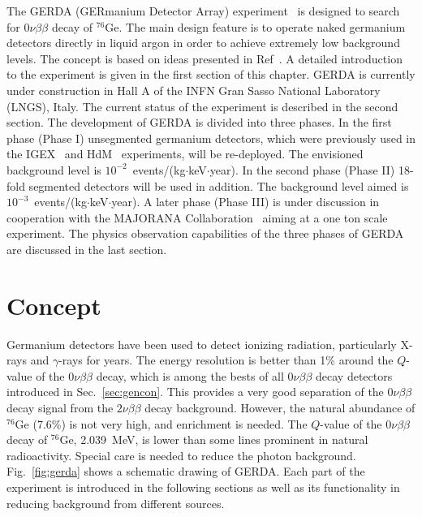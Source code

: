 The GERDA (GERmanium Detector Array) experiment~\cite{Abt04, Sch05} is designed to search for $0\nu\beta\beta$ decay of $^{76}$Ge. The main design feature is to operate naked germanium detectors directly in liquid argon in order to achieve extremely low background levels. The concept is based on ideas presented in Ref~\cite{Heu95}. A detailed introduction to the experiment is given in the first section of this chapter. GERDA is currently under construction in Hall A of the INFN Gran Sasso National Laboratory (LNGS), Italy. The current status of the experiment is described in the second section. The development of GERDA is divided into three phases. In the first phase (Phase I) unsegmented germanium detectors, which were previously used in the IGEX~\cite{Aal02} and HdM~\cite{Hei04} experiments, will be re-deployed. The envisioned background level is $10^{-2}$~events/(kg$\cdot$keV$\cdot$year). In the second phase (Phase II) 18-fold segmented detectors will be used in addition. The background level aimed is $10^{-3}$~events/(kg$\cdot$keV$\cdot$year). A later phase (Phase III) is under discussion in cooperation with the MAJORANA Collaboration~\cite{Gai03,Aal04} aiming at a one ton scale experiment. The physics observation capabilities of the three phases of GERDA are discussed in the last section.

\section{Concept}
\label{sec:gerda:conc}
Germanium detectors have been used to detect ionizing radiation, particularly X-rays and $\gamma$-rays for years. The energy resolution is better than 1\% around the $Q$-value of the $0\nu\beta\beta$ decay, which is among the bests of all $0\nu\beta\beta$ decay detectors introduced in Sec.~\ref{sec:gencon}. This provides a very good separation of the $0\nu\beta\beta$ decay signal from the $2\nu\beta\beta$ decay background. However, the natural abundance of $^{76}$Ge (7.6\%) is not very high, and enrichment is needed. The $Q$-value of the $0\nu\beta\beta$ decay of $^{76}$Ge, 2.039~MeV, is lower than some lines prominent in natural radioactivity. Special care is needed to reduce the photon background. Fig.~\ref{fig:gerda} shows a schematic drawing of GERDA. Each part of the experiment is introduced in the following sections as well as its functionality in reducing background from different sources.

